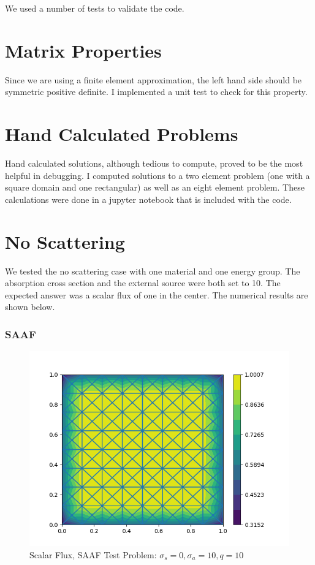We used a number of tests to validate the code. 
\section{Matrix Properties}
Since we are using a finite element approximation, the left hand side should be symmetric positive definite. I implemented a unit test to check for this property.

\section{Hand Calculated Problems}
Hand calculated solutions, although tedious to compute, proved to be the most helpful in debugging. I computed solutions to a two element problem (one with a square domain and one rectangular) as well as an eight element problem. These calculations were done in a jupyter notebook that is included with the code. 

\section{No Scattering}
We tested the no scattering case with one material and one energy group. The absorption cross section and the external source were both set to 10. The expected answer was a scalar flux of one in the center. The numerical results are shown below.
\subsubsection{SAAF}
\begin{figure}[H]
    \centering
    \includegraphics[width=\textwidth]{fig/saaf_noscat.png}
    \caption{Scalar Flux, SAAF Test Problem: $\sigma_s = 0, \sigma_a=10, q=10$}
    \label{fig:SAAF_noscatter}
\end{figure}
